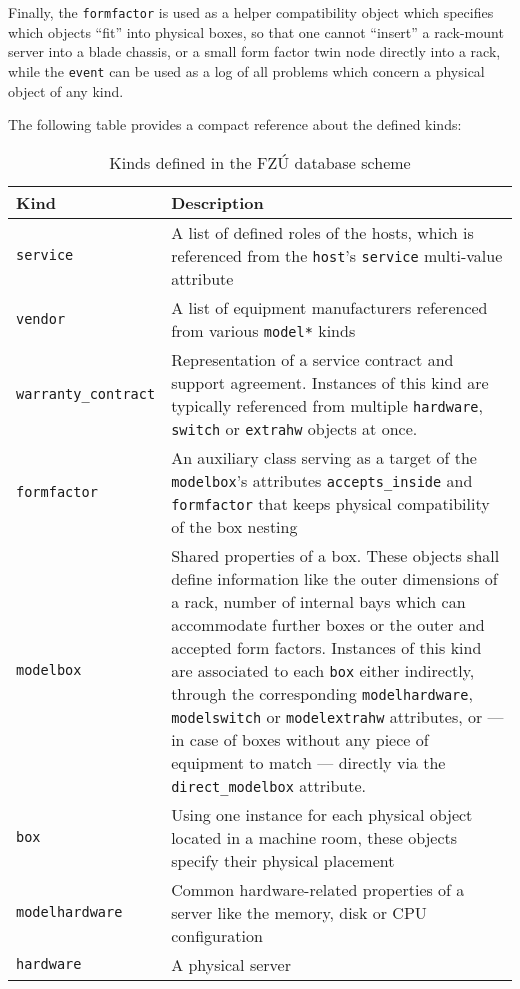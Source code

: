 \documentclass[deska]{subfiles}
\begin{document}
Finally, the {\tt formfactor} is used as a helper compatibility object which specifies which objects ``fit'' into
physical boxes, so that one cannot ``insert'' a rack-mount server into a blade chassis, or a small form factor twin node
directly into a rack, while the {\tt event} can be used as a log of all problems which concern a physical object of any
kind.

The following table provides a compact reference about the defined kinds:

\begin{longtable}{ l | p{10cm}}
    \caption{Kinds defined in the FZÚ database scheme} \\
    Kind & Description \\
    \hline
    \endhead
    \label{tbl:fzu-kinds}
    {\tt service} & A list of defined roles of the hosts, which is referenced from the {\tt host}'s {\tt service}
    multi-value attribute \\
    {\tt vendor} & A list of equipment manufacturers referenced from various {\tt model*} kinds \\
    {\tt warranty\_contract} & Representation of a service contract and support agreement.  Instances of this kind are
    typically referenced from multiple {\tt hardware}, {\tt switch} or {\tt extrahw} objects at once. \\
    {\tt formfactor} & An auxiliary class serving as a target of the {\tt modelbox}'s attributes {\tt accepts\_inside}
    and {\tt formfactor} that keeps physical compatibility of the box nesting \\
    {\tt modelbox} & Shared properties of a box.  These objects shall define information like the outer dimensions of a
    rack, number of internal bays which can accommodate further boxes or the outer and accepted form factors.  Instances
    of this kind are associated to each {\tt box} either indirectly, through the corresponding {\tt modelhardware},
    {\tt modelswitch} or {\tt modelextrahw} attributes, or --- in case of boxes without any piece of equipment to match
    --- directly via the {\tt direct\_modelbox} attribute. \\
    {\tt box} & Using one instance for each physical object located in a machine room, these objects specify their
    physical placement \\
    {\tt modelhardware} & Common hardware-related properties of a server like the memory, disk or CPU configuration \\
    {\tt hardware} & A physical server \\

\end{longtable}
\end{document}
